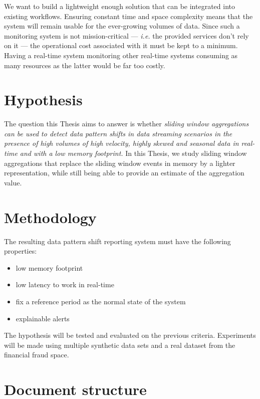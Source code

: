 We want to build a lightweight enough solution that can be integrated into existing workflows. Ensuring constant time and space complexity means that the system will remain usable for the ever-growing volumes of data. Since such a monitoring system is not mission-critical --- \textit{i.e.} the provided services don't rely on it --- the operational cost associated with it must be kept to a minimum. Having a real-time system monitoring other real-time systems consuming as many resources as the latter would be far too costly.

\section{Hypothesis} \label{sec:hypothesis}
The question this Thesis aims to answer is whether \textit{sliding window aggregations can be used to detect data pattern shifts in data streaming scenarios in the presence of high volumes of high velocity, highly skewed and seasonal data in real-time and with a low memory footprint.} In this Thesis, we study sliding window aggregations that replace the sliding window events in memory by a lighter representation, while still being able to provide an estimate of the aggregation value.

\section{Methodology} \label{sec:methodology}

The resulting data pattern shift reporting system must have the following properties:
\begin{itemize}
    \item low memory footprint
    
    \item low latency to work in real-time
    
    \item fix a reference period as the normal state of the system
    
    \item explainable alerts
\end{itemize}
The hypothesis will be tested and evaluated on the previous criteria. Experiments will be made using multiple synthetic data sets and a real dataset from the financial fraud space.

\section{Document structure} 


